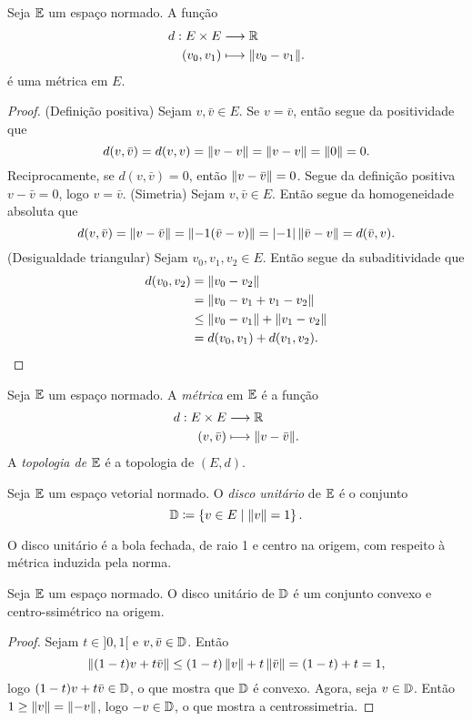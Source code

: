 \begin{prop}
Seja $\mathbb{E}$ um espaço normado. A função
	\begin{align*}
	{d}: {E \times E} &\longrightarrow {\mathbb{R}} \\{(v_0,v_1)} &\longmapsto {\left\Vert{v_0 - v_1}\right\Vert}.
	\end{align*}
é uma métrica em $E$.
\end{prop}
\begin{proof}
(Definição positiva) Sejam $v,\bar v \in E$. Se $v = \bar v$, então segue da positividade que
	\begin{equation*}
	d(v,\bar v) = d(v,v) = \left\Vert{v - v}\right\Vert = \left\Vert{v-v}\right\Vert=\left\Vert{0}\right\Vert=0.
	\end{equation*}
Reciprocamente, se $d(v,\bar v)=0$, então $\left\Vert{v-\bar v}\right\Vert=0$. Segue da definição positiva $v-\bar v=0$, logo $v=\bar v$.
(Simetria)  Sejam $v,\bar v \in E$. Então segue da homogeneidade absoluta que
	\begin{equation*}
	d(v,\bar v)=\left\Vert{v-\bar v}\right\Vert=\left\Vert{-1(\bar v -v)}\right\Vert=\left\vert{-1}\right\vert\left\Vert{\bar v - v}\right\Vert=d(\bar v,v).
	\end{equation*}
(Desigualdade triangular) Sejam $v_0,v_1,v_2 \in E$. Então segue da subaditividade que
	\begin{align*}
	d(v_0,v_2) &= \left\Vert{v_0-v_2}\right\Vert \\
		&=\left\Vert{v_0-v_1+v_1-v_2}\right\Vert \\
		&\leq \left\Vert{v_0-v_1}\right\Vert+\left\Vert{v_1-v_2}\right\Vert \\
		&=d(v_0,v_1)+d(v_1,v_2).
	\end{align*}	
\end{proof}

\begin{defi}
Seja $\mathbb{E}$ um espaço normado. A \emph{métrica} em $\mathbb{E}$ é a função
	\begin{align*}
	{d}: {E \times E} &\longrightarrow {\mathbb{R}} \\{(v,\bar v)} &\longmapsto {\left\Vert{v - \bar v}\right\Vert}.
	\end{align*}	
A \emph{topologia de $\mathbb{E}$} é a topologia de $(E,d)$.
\end{defi}

\begin{defi}
Seja $\mathbb{E}$ um espaço vetorial normado. O \emph{disco unitário} de $\mathbb{E}$ é o conjunto
	\begin{equation*}
	\mathbb{D} \coloneqq \left\{v \in E \;\middle\vert\; \left\Vert{v}\right\Vert=1 \right\}.
	\end{equation*}
\end{defi}

O disco unitário é a bola fechada, de raio 1 e centro na origem, com respeito à métrica induzida pela norma.

\begin{prop}
Seja $\mathbb{E}$ um espaço normado. O disco unitário de $\mathbb{D}$ é um conjunto convexo e centro-ssimétrico na origem.
\end{prop}
\begin{proof}
Sejam $t \in ]0,1[$ e $v,\bar v \in \mathbb{D}$. Então
	\begin{equation*}
	\left\Vert{(1-t)v+t\bar v}\right\Vert \leq (1-t)\left\Vert{v}\right\Vert+t\left\Vert{\bar v}\right\Vert =(1-t)+t=1,
	\end{equation*}
logo $(1-t)v+t\bar v \in \mathbb{D}$, o que mostra que $\mathbb{D}$ é convexo. Agora, seja $v \in \mathbb{D}$. Então $1 \geq \left\Vert{v}\right\Vert = \left\Vert{-v}\right\Vert$, logo $-v \in \mathbb{D}$, o que mostra a centrossimetria.
\end{proof}

